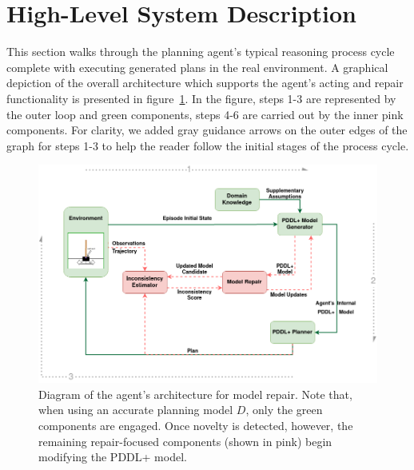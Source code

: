 \documentclass[letterpaper]{article} %
\begin{document}
\section{High-Level System Description}

This section walks through the planning agent's typical reasoning process cycle complete with executing generated plans in the real environment. A graphical depiction of the overall architecture which supports the agent's acting and repair functionality is presented in figure~\ref{fig:repair_architecture}. In the figure, steps 1-3 are represented by the outer loop and green components, steps 4-6 are carried out by the inner pink components. For clarity, we added gray guidance arrows on the outer edges of the graph for steps 1-3 to help the reader follow the initial stages of the process cycle.

\begin{figure}
	\centering
	\includegraphics[width=\columnwidth]{figures/repair_architecture_guide.png}
	\caption{Diagram of the agent's architecture for model repair. Note that, when using an accurate planning model $D$, only the green components are engaged. Once novelty is detected, however, the remaining repair-focused components (shown in pink) begin modifying the PDDL+ model.}
	\label{fig:repair_architecture}
\end{figure}
\end{document}
